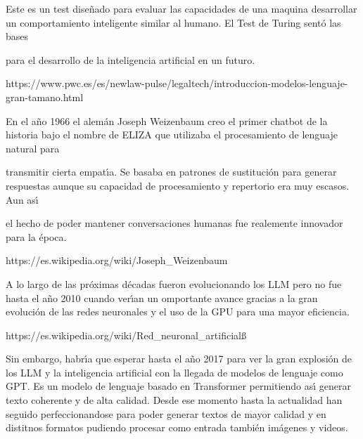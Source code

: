 Este es un test dise\~{n}ado para evaluar las capacidades de una maquina
desarrollar un comportamiento inteligente similar al humano. El Test de Turing
sent\'{o} las bases

para el desarrollo de la inteligencia artificial en un futuro.

https://www.pwc.es/es/newlaw-pulse/legaltech/introduccion-modelos-lenguaje-gran-tamano.html

\bigskip

En el a\~{n}o 1966 el alem\'{a}n Joseph Weizenbaum creo el primer chatbot de
la historia bajo el nombre de ELIZA que utilizaba el procesamiento de lenguaje
natural para

transmitir cierta empat\'{\i}a. Se basaba en patrones de sustituci\'{o}n para
generar respuestas aunque su capacidad de procesamiento y repertorio era muy
escasos. Aun as\'{\i}

el hecho de poder mantener conversaciones humanas fue realemente innovador
para la \'{e}poca.

https://es.wikipedia.org/wiki/Joseph\_Weizenbaum

\bigskip

A lo largo de las pr\'{o}ximas d\'{e}cadas fueron evolucionando los LLM pero
no fue hasta el a\~{n}o 2010 cuando ver\'{\i}an un omportante avance gracias a
la gran evoluci\'{o}n de las redes neuronales y el uso de la GPU para una
mayor eficiencia.

https://es.wikipedia.org/wiki/Red\_neuronal\_artificial\ss 

\bigskip

Sin embargo, habr\'{\i}a que esperar hasta el a\~{n}o 2017 para ver la gran
explosi\'{o}n de los LLM y la inteligencia artificial con la llegada de
modelos de lenguaje como GPT. Es un modelo de lenguaje basado en Transformer
permitiendo as\'{\i} generar texto coherente y de alta calidad. Desde ese
momento hasta la actualidad han seguido perfeccionandose para poder generar
textos de mayor calidad y en distitnos formatos pudiendo procesar como entrada
tambi\'{e}n im\'{a}genes y videos.


